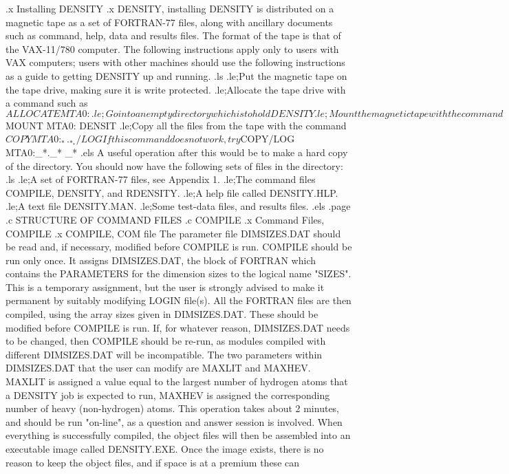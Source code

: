 .x Installing DENSITY
.x DENSITY, installing
  DENSITY is distributed on a magnetic tape as a set of FORTRAN-77 files,
along with ancillary documents such as command, help, data and results files.
The format of the tape is that of the VAX-11/780 computer. The following
instructions apply only to users with VAX computers; users with other machines
should use the following instructions as a guide to getting DENSITY up and
running.
.ls
.le;Put the magnetic tape on the tape drive, making sure it is write protected.
.le;Allocate the tape drive with a command such as $ALLOCATE MTA0:
.le;Go into an empty directory which is to hold DENSITY
.le;Mount the magnetic tape with the command $MOUNT MTA0: DENSIT
.le;Copy all the files from the tape with the command $COPY MTA0:_*._* _*/LOG
 If this command does not work, try $COPY/LOG MTA0:_*._* _*
.els
 A useful operation after this would be to make a hard copy of the
directory.  You should now have the following sets of files in the directory:
.ls
.le;A set of FORTRAN-77 files, see Appendix 1.
.le;The command files COMPILE, DENSITY, and RDENSITY.
.le;A help file called DENSITY.HLP.
.le;A text file DENSITY.MAN.
.le;Some test-data files, and results files.
.els
.page
.c
STRUCTURE OF COMMAND FILES
.c
COMPILE
.x Command Files, COMPILE
.x COMPILE, COM file
 The parameter file DIMSIZES.DAT should be read and, if necessary, modified
before COMPILE is run.
 COMPILE should be run only once. It assigns DIMSIZES.DAT,
the block of FORTRAN which contains the PARAMETERS for the 
dimension sizes to the logical name "SIZES". This is a 
temporary assignment, but the user is strongly advised to make it 
permanent by suitably modifying LOGIN file(s).
 All the FORTRAN files are then compiled, using the array sizes given in
DIMSIZES.DAT. These should be modified before COMPILE is run. If, for 
whatever reason, DIMSIZES.DAT needs to be changed, then COMPILE should be
re-run, as modules compiled with different DIMSIZES.DAT will be 
incompatible. 
 The two parameters within DIMSIZES.DAT that the user can modify are
MAXLIT and MAXHEV. MAXLIT is assigned a value equal to the largest number
of hydrogen atoms that a DENSITY job is expected to run, MAXHEV is assigned the
corresponding number of heavy (non-hydrogen) atoms. 
 This operation takes about 2 minutes, and should be run "on-line", as a
question and answer session is involved.
 When everything is successfully compiled, the object files will then be
assembled into an executable image called DENSITY.EXE. Once the image exists, 
there is no
reason to keep the object files, and if space is at a premium these can
